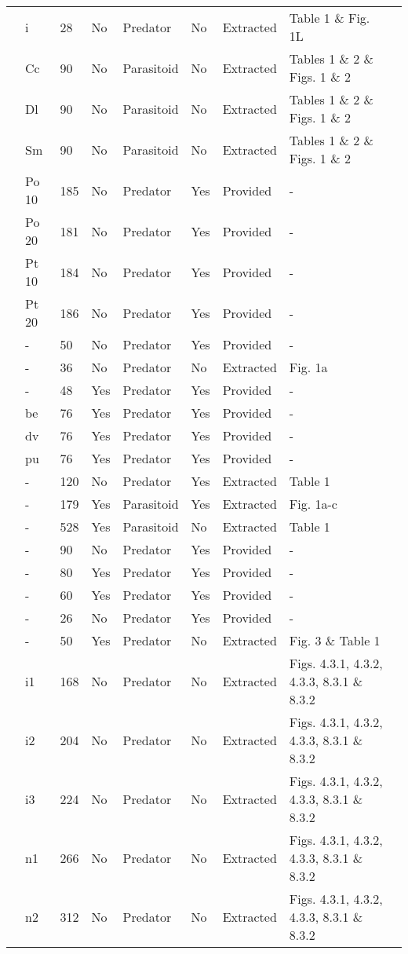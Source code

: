 \begin{longtable}{lllllllll}
\citet{Krylov:1992aa}&i&28&No&Predator&No&Extracted&Table 1 \& Fig. 1L&\citet{Novak:2020aa}\tabularnewline
\citet{Kumar:1985aa}&Cc&90&No&Parasitoid&No&Extracted&Tables 1 \& 2 \& Figs. 1 \& 2&\citet{Novak:2020aa}\tabularnewline
\citet{Kumar:1985aa}&Dl&90&No&Parasitoid&No&Extracted&Tables 1 \& 2 \& Figs. 1 \& 2&\citet{Novak:2020aa}\tabularnewline
\citet{Kumar:1985aa}&Sm&90&No&Parasitoid&No&Extracted&Tables 1 \& 2 \& Figs. 1 \& 2&\citet{Novak:2020aa}\tabularnewline
\citet{Lang:2012aa}&Po 10&185&No&Predator&Yes&Provided&-&\citet{Lang:2020aa}\tabularnewline
\citet{Lang:2012aa}&Po 20&181&No&Predator&Yes&Provided&-&\citet{Lang:2020aa}\tabularnewline
\citet{Lang:2012aa}&Pt 10&184&No&Predator&Yes&Provided&-&\citet{Lang:2020aa}\tabularnewline
\citet{Lang:2012aa}&Pt 20&186&No&Predator&Yes&Provided&-&\citet{Lang:2020aa}\tabularnewline
\citet{Long:2012aa}&-&50&No&Predator&Yes&Provided&-&\citet{Long:2020aa}\tabularnewline
\citet{Mansour:1991aa}&-&36&No&Predator&No&Extracted&Fig. 1a&\citet{Novak:2020aa}\tabularnewline
\citet{Medoc:2013aa}&-&48&Yes&Predator&Yes&Provided&-&\tabularnewline
\citet{Medoc:2015aa}&be&76&Yes&Predator&Yes&Provided&-&\tabularnewline
\citet{Medoc:2015aa}&dv&76&Yes&Predator&Yes&Provided&-&\tabularnewline
\citet{Medoc:2015aa}&pu&76&Yes&Predator&Yes&Provided&-&\tabularnewline
\citet{Mertz:1968aa}&-&120&No&Predator&Yes&Extracted&Table 1&\citet{Novak:2020aa}\tabularnewline
\citet{Mills:2004aa}&-&179&Yes&Parasitoid&Yes&Extracted&Fig. 1a-c&\citet{Novak:2020aa}\tabularnewline
\citet{Montoya:2000aa}&-&528&Yes&Parasitoid&No&Extracted&Table 1&\citet{Novak:2020aa}\tabularnewline
\citet{Omkar:2004aa}&-&90&No&Predator&Yes&Provided&-&\tabularnewline
\citet{Prokopenko:2017aa}&-&80&Yes&Predator&Yes&Provided&-&\citet{Prokopenko:2020aa}\tabularnewline
\citet{Pusack:2018aa}&-&60&Yes&Predator&Yes&Provided&-&\citet{Pusack:2020aa}\tabularnewline
\citet{Reeve:1997aa}&-&26&No&Predator&Yes&Provided&-&\citet{Reeve:2020aa}\tabularnewline
\citet{Salt:1974aa}&-&50&Yes&Predator&No&Extracted&Fig. 3 \& Table 1&\citet{Novak:2020aa}\tabularnewline
\citet{Uttley:1980aa}&i1&168&No&Predator&No&Extracted&Figs. 4.3.1, 4.3.2, 4.3.3, 8.3.1 \& 8.3.2&\citet{Novak:2020aa}\tabularnewline
\citet{Uttley:1980aa}&i2&204&No&Predator&No&Extracted&Figs. 4.3.1, 4.3.2, 4.3.3, 8.3.1 \& 8.3.2&\citet{Novak:2020aa}\tabularnewline
\citet{Uttley:1980aa}&i3&224&No&Predator&No&Extracted&Figs. 4.3.1, 4.3.2, 4.3.3, 8.3.1 \& 8.3.2&\citet{Novak:2020aa}\tabularnewline
\citet{Uttley:1980aa}&n1&266&No&Predator&No&Extracted&Figs. 4.3.1, 4.3.2, 4.3.3, 8.3.1 \& 8.3.2&\citet{Novak:2020aa}\tabularnewline
\citet{Uttley:1980aa}&n2&312&No&Predator&No&Extracted&Figs. 4.3.1, 4.3.2, 4.3.3, 8.3.1 \& 8.3.2&\citet{Novak:2020aa}\tabularnewline

\end{longtable}
